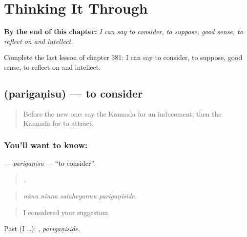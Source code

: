 
\chapter{Thinking It Through}
\label{ch:ka-thinking-it-through}

\begin{chapteropening}
\textbf{By the end of this chapter:} \emph{I can say to consider, to suppose, good sense, to reflect on and intellect.}

Complete the last lesson of chapter 381: I can say to consider, to suppose, good sense, to reflect on and intellect.
\end{chapteropening}

\section[\texorpdfstring{\kn{ಪರಿಗಣಿಸು} (parigaṇisu)}{ಪರಿಗಣಿಸು (parigaṇisu)}]{ (parigaṇisu) — to consider}

\label{lesson:KA-C381-pariganisu}



\begin{quote}
Before the new one: say the Kannada for an inducement, then the Kannada for to attract.
\end{quote}

\subsection*{You'll want to know: }
\textbf{} — \emph{parigaṇisu} — \textquotedblleft{}to consider\textquotedblright{}.

\begin{quote}
   .
\end{quote}

\begin{quote}
\emph{nānu ninna salaheyannu parigaṇiside.}
\end{quote}

\begin{quote}
I considered your suggestion.
\end{quote}

Past (I …): , \emph{parigaṇiside}.

